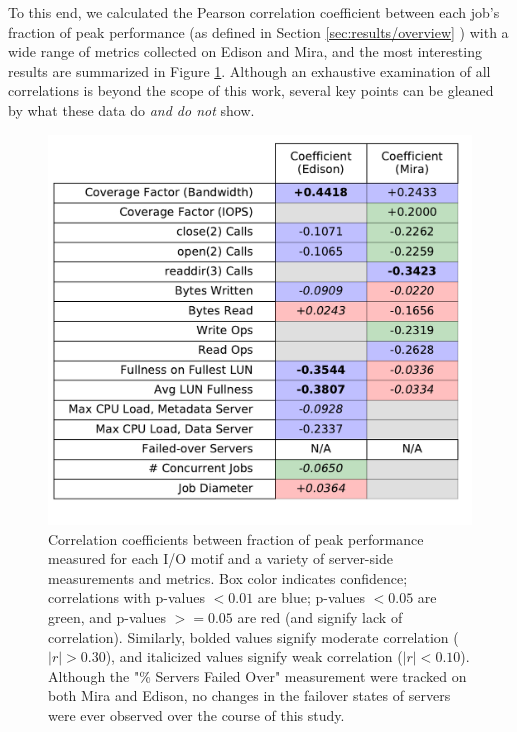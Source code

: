 To this end, we calculated the Pearson correlation coefficient between each job's fraction of peak performance (as defined in Section \ref{sec:results/overview} ) with a wide range of metrics collected on Edison and Mira, and the most interesting results are summarized in Figure \ref{fig:correlation-table}.
Although an exhaustive examination of all correlations is beyond the scope of this work, several key points can be gleaned by what these data do \emph{and do not} show.

\begin{figure}[t]
    \centering
    \includegraphics[width=\columnwidth]{figs/correlation_table.pdf}
    \caption{Correlation coefficients between fraction of peak performance measured for each I/O motif and a variety of server-side measurements and metrics.  Box color indicates confidence; correlations with p-values $< 0.01$ are blue; p-values $< 0.05$ are green, and p-values $>= 0.05$ are red (and signify lack of correlation).  Similarly, bolded values signify moderate correlation ($|r| > 0.30$), and italicized values signify weak correlation ($|r| < 0.10$).  Although the "\% Servers Failed Over" measurement were tracked on both Mira and Edison, no changes in the
    failover states of servers were ever observed over the course of this study.
    }
    \label{fig:correlation-table}
\end{figure}

